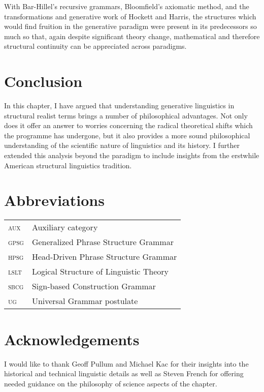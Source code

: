 \documentclass[output=paper]{langscibook}
\begin{document}
With Bar-Hillel's recursive grammars, Bloomfield's axiomatic method, and the transformations and generative work of Hockett and Harris, the structures which would find fruition in the generative paradigm were present in its predecessors so much so that, again despite significant theory change, mathematical and therefore structural continuity can be appreciated across paradigms. 

\section{Conclusion}
\label{sec:nefdt:conc}

In this chapter, I have argued that understanding generative linguistics in structural realist terms brings a number of philosophical advantages. Not only does it offer an answer to worries concerning the radical theoretical shifts which the programme has undergone, but it also provides a more sound philosophical understanding of the scientific nature of linguistics and its history. I further extended this analysis beyond the paradigm to include insights from the erstwhile American structural linguistics tradition. 

\section*{Abbreviations}
\label{sec:nefdt:abbr}

\begin{tabularx}{.8\textwidth}{lQ}
\textsc{aux} & Auxiliary category\\
\textsc{gpsg} & Generalized Phrase Structure Grammar\\
\textsc{hpsg} & Head-Driven Phrase Structure Grammar\\ 
\textsc{lslt} & Logical Structure of Linguistic Theory
\\\textsc{sbcg} & Sign-based Construction Grammar
\\\textsc{ug} & Universal Grammar postulate
\end{tabularx}

\section*{Acknowledgements}
\label{sec:nefdt:ackn}

 I would like to thank Geoff Pullum and Michael Kac for their insights into the historical and technical linguistic details as well as Steven French for offering needed guidance on the philosophy of science aspects of the chapter.


{\sloppy
\printbibliography[heading=subbibliography,notkeyword=this]
  
}
\end{document}
